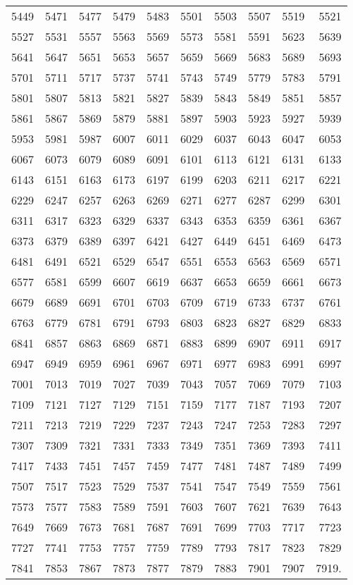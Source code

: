 \documentclass[12pt]{article}
\begin{document}
\begin{tabular}{rrrrrrrrrr}
5449 & 5471 & 5477 & 5479 & 5483 & 5501 & 5503 & 5507 & 5519 & 5521 \\
5527 & 5531 & 5557 & 5563 & 5569 & 5573 & 5581 & 5591 & 5623 & 5639 \\
5641 & 5647 & 5651 & 5653 & 5657 & 5659 & 5669 & 5683 & 5689 & 5693 \\
5701 & 5711 & 5717 & 5737 & 5741 & 5743 & 5749 & 5779 & 5783 & 5791 \\
5801 & 5807 & 5813 & 5821 & 5827 & 5839 & 5843 & 5849 & 5851 & 5857 \\
5861 & 5867 & 5869 & 5879 & 5881 & 5897 & 5903 & 5923 & 5927 & 5939 \\
5953 & 5981 & 5987 & 6007 & 6011 & 6029 & 6037 & 6043 & 6047 & 6053 \\
6067 & 6073 & 6079 & 6089 & 6091 & 6101 & 6113 & 6121 & 6131 & 6133 \\
6143 & 6151 & 6163 & 6173 & 6197 & 6199 & 6203 & 6211 & 6217 & 6221 \\
6229 & 6247 & 6257 & 6263 & 6269 & 6271 & 6277 & 6287 & 6299 & 6301 \\
6311 & 6317 & 6323 & 6329 & 6337 & 6343 & 6353 & 6359 & 6361 & 6367 \\
6373 & 6379 & 6389 & 6397 & 6421 & 6427 & 6449 & 6451 & 6469 & 6473 \\
6481 & 6491 & 6521 & 6529 & 6547 & 6551 & 6553 & 6563 & 6569 & 6571 \\
6577 & 6581 & 6599 & 6607 & 6619 & 6637 & 6653 & 6659 & 6661 & 6673 \\
6679 & 6689 & 6691 & 6701 & 6703 & 6709 & 6719 & 6733 & 6737 & 6761 \\
6763 & 6779 & 6781 & 6791 & 6793 & 6803 & 6823 & 6827 & 6829 & 6833 \\
6841 & 6857 & 6863 & 6869 & 6871 & 6883 & 6899 & 6907 & 6911 & 6917 \\
6947 & 6949 & 6959 & 6961 & 6967 & 6971 & 6977 & 6983 & 6991 & 6997 \\
7001 & 7013 & 7019 & 7027 & 7039 & 7043 & 7057 & 7069 & 7079 & 7103 \\
7109 & 7121 & 7127 & 7129 & 7151 & 7159 & 7177 & 7187 & 7193 & 7207 \\
7211 & 7213 & 7219 & 7229 & 7237 & 7243 & 7247 & 7253 & 7283 & 7297 \\
7307 & 7309 & 7321 & 7331 & 7333 & 7349 & 7351 & 7369 & 7393 & 7411 \\
7417 & 7433 & 7451 & 7457 & 7459 & 7477 & 7481 & 7487 & 7489 & 7499 \\
7507 & 7517 & 7523 & 7529 & 7537 & 7541 & 7547 & 7549 & 7559 & 7561 \\
7573 & 7577 & 7583 & 7589 & 7591 & 7603 & 7607 & 7621 & 7639 & 7643 \\
7649 & 7669 & 7673 & 7681 & 7687 & 7691 & 7699 & 7703 & 7717 & 7723 \\
7727 & 7741 & 7753 & 7757 & 7759 & 7789 & 7793 & 7817 & 7823 & 7829 \\
7841 & 7853 & 7867 & 7873 & 7877 & 7879 & 7883 & 7901 & 7907 & 7919. \\
\end{tabular}
\end{document}
